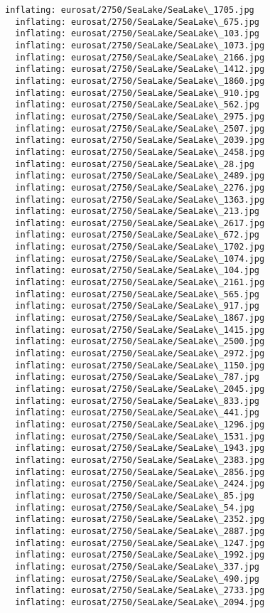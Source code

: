 \documentclass[11pt]{article}
\begin{document}
\begin{Verbatim}[commandchars=\\\{\}]
  inflating: eurosat/2750/SeaLake/SeaLake\_1705.jpg
  inflating: eurosat/2750/SeaLake/SeaLake\_675.jpg
  inflating: eurosat/2750/SeaLake/SeaLake\_103.jpg
  inflating: eurosat/2750/SeaLake/SeaLake\_1073.jpg
  inflating: eurosat/2750/SeaLake/SeaLake\_2166.jpg
  inflating: eurosat/2750/SeaLake/SeaLake\_1412.jpg
  inflating: eurosat/2750/SeaLake/SeaLake\_1860.jpg
  inflating: eurosat/2750/SeaLake/SeaLake\_910.jpg
  inflating: eurosat/2750/SeaLake/SeaLake\_562.jpg
  inflating: eurosat/2750/SeaLake/SeaLake\_2975.jpg
  inflating: eurosat/2750/SeaLake/SeaLake\_2507.jpg
  inflating: eurosat/2750/SeaLake/SeaLake\_2039.jpg
  inflating: eurosat/2750/SeaLake/SeaLake\_2458.jpg
  inflating: eurosat/2750/SeaLake/SeaLake\_28.jpg
  inflating: eurosat/2750/SeaLake/SeaLake\_2489.jpg
  inflating: eurosat/2750/SeaLake/SeaLake\_2276.jpg
  inflating: eurosat/2750/SeaLake/SeaLake\_1363.jpg
  inflating: eurosat/2750/SeaLake/SeaLake\_213.jpg
  inflating: eurosat/2750/SeaLake/SeaLake\_2617.jpg
  inflating: eurosat/2750/SeaLake/SeaLake\_672.jpg
  inflating: eurosat/2750/SeaLake/SeaLake\_1702.jpg
  inflating: eurosat/2750/SeaLake/SeaLake\_1074.jpg
  inflating: eurosat/2750/SeaLake/SeaLake\_104.jpg
  inflating: eurosat/2750/SeaLake/SeaLake\_2161.jpg
  inflating: eurosat/2750/SeaLake/SeaLake\_565.jpg
  inflating: eurosat/2750/SeaLake/SeaLake\_917.jpg
  inflating: eurosat/2750/SeaLake/SeaLake\_1867.jpg
  inflating: eurosat/2750/SeaLake/SeaLake\_1415.jpg
  inflating: eurosat/2750/SeaLake/SeaLake\_2500.jpg
  inflating: eurosat/2750/SeaLake/SeaLake\_2972.jpg
  inflating: eurosat/2750/SeaLake/SeaLake\_1150.jpg
  inflating: eurosat/2750/SeaLake/SeaLake\_787.jpg
  inflating: eurosat/2750/SeaLake/SeaLake\_2045.jpg
  inflating: eurosat/2750/SeaLake/SeaLake\_833.jpg
  inflating: eurosat/2750/SeaLake/SeaLake\_441.jpg
  inflating: eurosat/2750/SeaLake/SeaLake\_1296.jpg
  inflating: eurosat/2750/SeaLake/SeaLake\_1531.jpg
  inflating: eurosat/2750/SeaLake/SeaLake\_1943.jpg
  inflating: eurosat/2750/SeaLake/SeaLake\_2383.jpg
  inflating: eurosat/2750/SeaLake/SeaLake\_2856.jpg
  inflating: eurosat/2750/SeaLake/SeaLake\_2424.jpg
  inflating: eurosat/2750/SeaLake/SeaLake\_85.jpg
  inflating: eurosat/2750/SeaLake/SeaLake\_54.jpg
  inflating: eurosat/2750/SeaLake/SeaLake\_2352.jpg
  inflating: eurosat/2750/SeaLake/SeaLake\_2887.jpg
  inflating: eurosat/2750/SeaLake/SeaLake\_1247.jpg
  inflating: eurosat/2750/SeaLake/SeaLake\_1992.jpg
  inflating: eurosat/2750/SeaLake/SeaLake\_337.jpg
  inflating: eurosat/2750/SeaLake/SeaLake\_490.jpg
  inflating: eurosat/2750/SeaLake/SeaLake\_2733.jpg
  inflating: eurosat/2750/SeaLake/SeaLake\_2094.jpg

\end{Verbatim}
\end{document}
